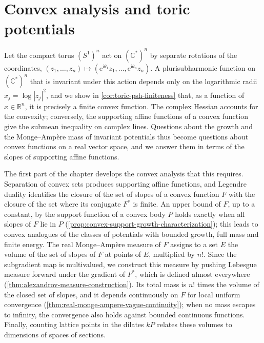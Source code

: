 \chapter{Convex analysis and toric potentials}
\label{chap:q16}
Let the compact torus $(S^1)^n$ act on $(\mathbb C^*)^n$ by separate rotations of the coordinates, $(z_1,\ldots,z_n)\mapsto(\mathrm e^{\mathrm i\theta_1}z_1,\ldots,\mathrm e^{\mathrm i\theta_n}z_n)$. A plurisubharmonic function on $(\mathbb C^*)^n$ that is invariant under this action depends only on the logarithmic radii $x_j=\log|z_j|^2$, and we show in \cref{cor:toric-psh-finiteness} that, as a function of $x\in\mathbb R^n$, it is precisely a finite convex function. The complex Hessian accounts for the convexity; conversely, the supporting affine functions of a convex function give the submean inequality on complex lines. Questions about the growth and the Monge--Amp\`ere mass of invariant potentials thus become questions about convex functions on a real vector space, and we answer them in terms of the slopes of supporting affine functions.

The first part of the chapter develops the convex analysis that this requires. Separation of convex sets produces supporting affine functions, and Legendre duality identifies the closure of the set of slopes of a convex function $F$ with the closure of the set where its conjugate $F^*$ is finite. An upper bound of $F$, up to a constant, by the support function of a convex body $P$ holds exactly when all slopes of $F$ lie in $P$ (\cref{prop:convex-support-growth-characterization}); this leads to convex analogues of the classes of potentials with bounded growth, full mass and finite energy. The real Monge--Amp\`ere measure of $F$ assigns to a set $E$ the volume of the set of slopes of $F$ at points of $E$, multiplied by $n!$. Since the subgradient map is multivalued, we construct this measure by pushing Lebesgue measure forward under the gradient of $F^*$, which is defined almost everywhere (\cref{thm:alexandrov-measure-construction}). Its total mass is $n!$ times the volume of the closed set of slopes, and it depends continuously on $F$ for local uniform convergence (\cref{thm:real-monge-ampere-vague-continuity}); when no mass escapes to infinity, the convergence also holds against bounded continuous functions. Finally, counting lattice points in the dilates $kP$ relates these volumes to dimensions of spaces of sections.


